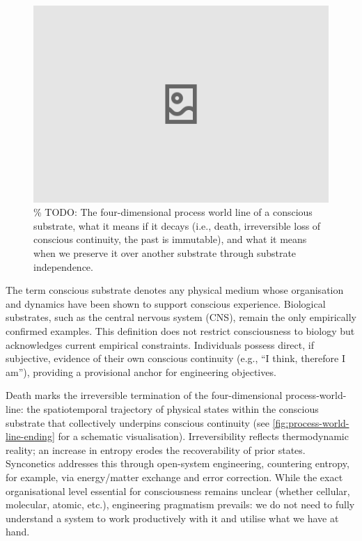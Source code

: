 \documentclass[10pt]{article}
\begin{document}
\begin{sloppypar}
  \begin{figure}[ht!]
    \centering
    \includegraphics[width=\textwidth]{figures/4D-process-world-line-ending.png}
    \caption{\% TODO: The four-dimensional process world line of a conscious substrate, what it means if it decays (i.e., death, irreversible loss of conscious continuity, the past is immutable), and what it means when we preserve it over another substrate through substrate independence.}
    \label{fig:process-world-line-ending}
  \end{figure}

  The term conscious substrate denotes any physical medium whose organisation and dynamics have been shown to support conscious experience. Biological substrates, such as the central nervous system (CNS), remain the only empirically confirmed examples. This definition does not restrict consciousness to biology but acknowledges current empirical constraints. Individuals possess direct, if subjective, evidence of their own conscious continuity (e.g., “I think, therefore I am”), providing a provisional anchor for engineering objectives.

  Death marks the irreversible termination of the four-dimensional process-world-line: the spatiotemporal trajectory of physical states within the conscious substrate that collectively underpins conscious continuity (see \autoref{fig:process-world-line-ending} for a schematic visualisation). Irreversibility reflects thermodynamic reality; an increase in entropy erodes the recoverability of prior states. Synconetics addresses this through open-system engineering, countering entropy, for example, via energy/matter exchange and error correction. While the exact organisational level essential for consciousness remains unclear (whether cellular, molecular, atomic, etc.), engineering pragmatism prevails: we do not need to fully understand a system to work productively with it and utilise what we have at hand.


\end{sloppypar}
\end{document}
